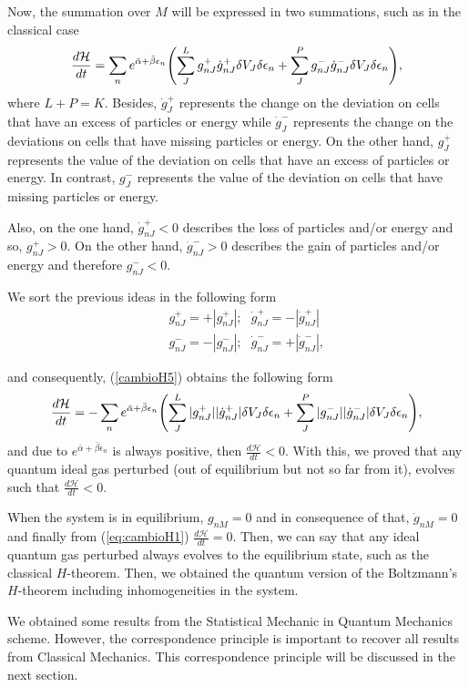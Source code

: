 \color{blue}



%
Now, the summation over $M$ will be expressed in two summations, such as in the
classical case
%
\begin{equation}
    \frac{d\mathcal{H}}{dt}=\sum_n  e^{\bar{\alpha}+\bar{\beta}\epsilon_n}\left(\sum_J ^{L} g^{+}_{nJ}\dot{g}^{+}_{nJ}\de V_J \delta \epsilon_n+\sum^{P}_J  g^{-}_{nJ}\dot{g}^{-}_{nJ} \de V_J\delta \epsilon_n \right), \label{cambioH5}
\end{equation}
%
where $L+P=K$. Besides, $\dot{g}^{+}_{J}$ represents the change on the
deviation on cells that have an excess of particles or energy while
$\dot{g}^{-}_{J}$  represents the change on the deviations on cells that have
missing particles or energy.
On the other hand, $g^{+}_{J}$  represents the value of the deviation on cells
that have an excess of particles or energy. In contrast, $g^{-}_{J}$ represents
the value of the deviation on cells that have missing particles or energy.

Also, on the one hand, $\dot{g}^{+}_{nJ}<0$ describes the loss of particles
and/or energy and so, $g^{+}_{nJ}>0$. On the other hand, $\dot{g}^{-}_{nJ}>0$
describes the gain of particles and/or energy and therefore $g^{-}_{nJ}<0$.

We sort the previous ideas in the following form
%
\begin{eqnarray}
   &&g^{+}_{nJ}=+|g^{+}_{nJ}|; \ \ \  \dot{g}^{+}_{nJ}=-|\dot{g}^{+}_{nJ}| \nonumber \\
   &&g^{-}_{nJ}=-|g^{-}_{nJ}|; \ \ \ \dot{g}^{-}_{nJ}=+|\dot{g}^{-}_{nJ}| \label{separacion},
\end{eqnarray}
%


and consequently, (\ref{cambioH5}) obtains the following form
%
\begin{equation}
    \frac{d\mathcal{H}}{dt}=-\sum_n  e^{\bar{\alpha}+\bar{\beta}\epsilon_n}\left(\sum_J ^{L} |g^{+}_{nJ}||\dot{g}^{+}_{nJ}|\de V_J \delta \epsilon_n+\sum^{P}_J  |g^{-}_{nJ}||\dot{g}^{-}_{nJ}| \de V_J \delta \epsilon_n \right), \label{cambioH6}
\end{equation}
%
and due to $e^{\bar{\alpha}+\bar{\beta}\epsilon_n}$ is always positive, then
$\frac{d\mathcal{H}}{dt}<0$. With this, we proved that any quantum ideal gas perturbed
(out of equilibrium but not so far from it), evolves such that
$\frac{d\mathcal{H}}{dt}<0$.

When the system is in equilibrium, $g_{nM}=0$ and in consequence of that, $\dot
g_{nM}=0$ and finally from (\ref{eq:cambioH1}) $\frac{d\mathcal{H}}{dt}=0$. Then, we can
say that any ideal quantum gas perturbed always evolves to the equilibrium
state, such as the classical $H$-theorem. Then, we obtained the quantum version
of the Boltzmann's $H$-theorem including inhomogeneities in the system.

We obtained some results from the Statistical Mechanic in Quantum Mechanics
scheme. However, the correspondence principle is important to recover all
results from Classical Mechanics. This correspondence principle will be
discussed in the next section.

 


